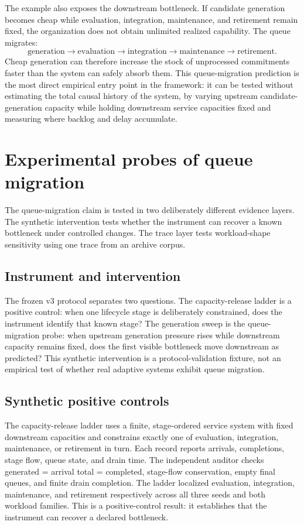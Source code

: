 \documentclass[11pt]{article}
\begin{document}
The example also exposes the downstream bottleneck. If candidate generation becomes cheap while evaluation, integration, maintenance, and retirement remain fixed, the organization does not obtain unlimited realized capability. The queue migrates:
\[
\text{generation}\rightarrow\text{evaluation}\rightarrow\text{integration}\rightarrow\text{maintenance}\rightarrow\text{retirement}.
\]
Cheap generation can therefore increase the stock of unprocessed commitments faster than the system can safely absorb them. This queue-migration prediction is the most direct empirical entry point in the framework: it can be tested without estimating the total causal history of the system, by varying upstream candidate-generation capacity while holding downstream service capacities fixed and measuring where backlog and delay accumulate.

\section{Experimental probes of queue migration}

The queue-migration claim is tested in two deliberately different evidence layers. The synthetic intervention tests whether the instrument can recover a known bottleneck under controlled changes. The trace layer tests workload-shape sensitivity using one trace from an archive corpus.

\subsection{Instrument and intervention}

The frozen v3 protocol separates two questions. The capacity-release ladder is a positive control: when one lifecycle stage is deliberately constrained, does the instrument identify that known stage? The generation sweep is the queue-migration probe: when upstream generation pressure rises while downstream capacity remains fixed, does the first visible bottleneck move downstream as predicted? This synthetic intervention is a protocol-validation fixture, not an empirical test of whether real adaptive systems exhibit queue migration.

\subsection{Synthetic positive controls}

The capacity-release ladder uses a finite, stage-ordered service system with fixed downstream capacities and constrains exactly one of evaluation, integration, maintenance, or retirement in turn. Each record reports arrivals, completions, stage flow, queue state, and drain time. The independent auditor checks generated = arrival total = completed, stage-flow conservation, empty final queues, and finite drain completion. The ladder localized evaluation, integration, maintenance, and retirement respectively across all three seeds and both workload families. This is a positive-control result: it establishes that the instrument can recover a declared bottleneck.
\end{document}
